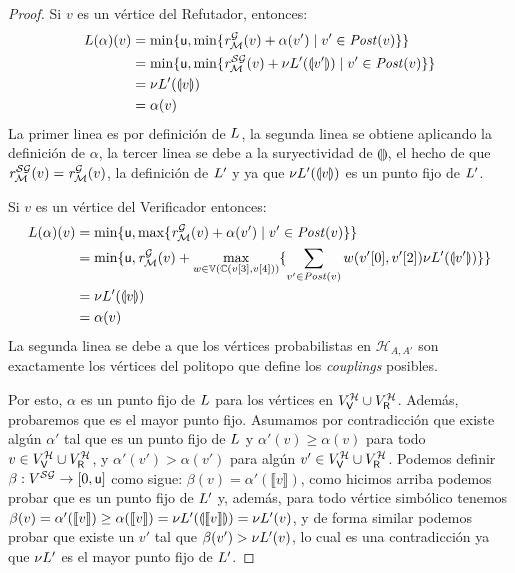 \begin{proof}
   Si $v$ es un vértice del Refutador,  entonces:
\begin{align}
   \Bellman(\alpha)(v) & =  \min \{\upperbound,  \min \{\mreward^\StochG(v)  + \alpha(v') \mid v' \in \post(v) \} \}  \\
                                    & =  \min \{\upperbound,  \min \{\mreward^\SymbG(v)  +\nu \Bellman'(\llparenthesis v'  \rrparenthesis) \mid v' \in \post(v) \} \} \\  
                                    & = \nu \Bellman'(\llparenthesis v  \rrparenthesis) \\
                                    & = \alpha(v)           
\end{align}
 La primer linea es por definición de $\Bellman$, la segunda linea se obtiene aplicando la definición de $\alpha$, la tercer linea se debe a la suryectividad de  $\llparenthesis \rrparenthesis$,  el hecho de que $\mreward^\SymbG(v) = \mreward^\StochG(v) $, la definición de $\Bellman'$ y ya que $\nu \Bellman'(\llparenthesis v  \rrparenthesis)$ es un punto fijo de $\Bellman'$.

    Si $v$ es un vértice del Verificador entonces:
\begin{align}
   \Bellman(\alpha)(v) & =   \min \{ \upperbound, \max \{\mreward^\StochG(v) + \alpha(v') \mid v' \in \post(v) \} \}  \\
                                    & =   \min \{ \upperbound, \mreward^\StochG(v) + \max_{w \in \vertices{\couplings{\pr{3}{v}}{\pr{4}{v}}}} \{\sum_{v' \in \post(v)} w(\pr{0}{v'},\pr{2}{v'})  \nu \Bellman'(\llparenthesis v' \rrparenthesis) \} \} \\  
                                    & = \nu \Bellman'(\llparenthesis v  \rrparenthesis) \\
                                    & = \alpha(v)           
\end{align}
    La segunda linea se debe a que los vértices probabilistas en $\mathcal{H}_{A,A'}$ son exactamente los vértices del politopo que define los \emph{couplings} posibles.

    Por esto, $\alpha$ es un punto fijo de $\Bellman$ para los vértices en $V^{\mathcal{H}}_\Verifier \cup V^{\mathcal{H}}_\Refuter$.  Además,  probaremos que es el mayor punto fijo. Asumamos por contradicción que existe algún $\alpha'$ tal que es un punto fijo de $\Bellman$ y $\alpha'(v) \geq  \alpha(v)$ para todo $v \in V^{\mathcal{H}}_\Verifier \cup V^{\mathcal{H}}_\Refuter$, y $\alpha'(v') >  \alpha(v')$ para algún $v' \in V^{\mathcal{H}}_\Verifier \cup V^{\mathcal{H}}_\Refuter$.  
    Podemos definir $\beta : V^{\SymbG} \rightarrow [0,\upperbound]$ como sigue: $\beta(v) = \alpha'(\llbracket v \rrbracket)$, como hicimos arriba podemos probar que es un punto fijo de $\Bellman'$ y, además, para todo vértice simbólico tenemos $\beta(v) =  \alpha'(\llbracket v \rrbracket) \geq \alpha(\llbracket v \rrbracket) = \nu \Bellman'(\llparenthesis \llbracket v \rrbracket \rrparenthesis)
    = \nu \Bellman'(v)$, y de forma similar podemos probar que existe un $v'$ tal que $\beta(v') >  \nu \Bellman'(v)$, lo cual es una contradicción ya que $\nu \Bellman'$ es el mayor punto fijo de $\Bellman'$.
\end{proof}\\

